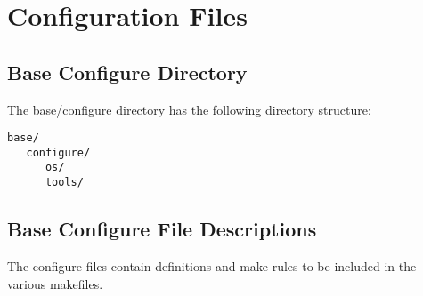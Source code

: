 \section{Configuration Files}

\subsection{Base Configure Directory}

The base/configure directory has the following directory structure:

\begin{verbatim}
base/
   configure/
      os/
      tools/
\end{verbatim}

\subsection{Base Configure File Descriptions}

The configure files contain definitions and make rules to be included in the various makefiles.


